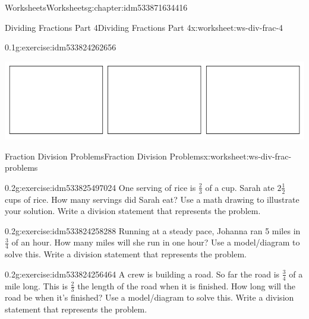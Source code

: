 \documentclass[twoside,11pt,]{book}
\begin{document}
\begin{chapterptx}{Worksheets}{}{Worksheets}{}{}{g:chapter:idm533871634416}
\begin{worksheet-section-numberless}{Dividing Fractions Part 4}{}{Dividing Fractions Part 4}{}{}{x:worksheet:ws-div-frac-4}
\begin{divisionexercise}{3}{}{0.1}{g:exercise:idm533824262656}
\begin{sidebyside}{1}{0.1}{0.1}{0}
\begin{sbspanel}{0.8}
\includegraphics[width=1\linewidth]{images/3-rectangles.png}
\end{sbspanel}%
\end{sidebyside}%
\end{divisionexercise}%
\end{worksheet-section-numberless}
\restoregeometry
%
%
\typeout{************************************************}
\typeout{************************************************}
%
\begin{worksheet-section-numberless}{Fraction Division Problems}{}{Fraction Division Problems}{}{}{x:worksheet:ws-div-frac-problems}
\begin{divisionexercise}{1}{}{0.2}{g:exercise:idm533825497024}%
One serving of rice is \(\frac{2}{3} \) of a cup.  Sarah ate \(2 \frac{1}{2} \) cups of rice.  How many servings did Sarah eat?  Use a math drawing to illustrate your solution.  Write a division statement that represents the problem.%
\end{divisionexercise}%
\begin{divisionexercise}{2}{}{0.2}{g:exercise:idm533824258288}%
Running at a steady pace, Johanna ran 5 miles in  \(\frac{3}{4} \)  of an hour.  How many miles will she run in one hour?  Use a model\slash{}diagram to solve this.  Write a division statement that represents the problem.%
\end{divisionexercise}%
\begin{divisionexercise}{3}{}{0.2}{g:exercise:idm533824256464}%
A crew is building a road.  So far the road is  \(\frac{3}{4} \) of a mile long.  This is  \(\frac{2}{3} \) the length of the road when it is finished.  How long will the road be when it’s finished? Use a model\slash{}diagram to solve this.  Write a division statement that represents the problem.%
\end{divisionexercise}%
\end{worksheet-section-numberless}
\restoregeometry
%
%
\typeout{************************************************}
\typeout{************************************************}

\end{chapterptx}
\end{document}
